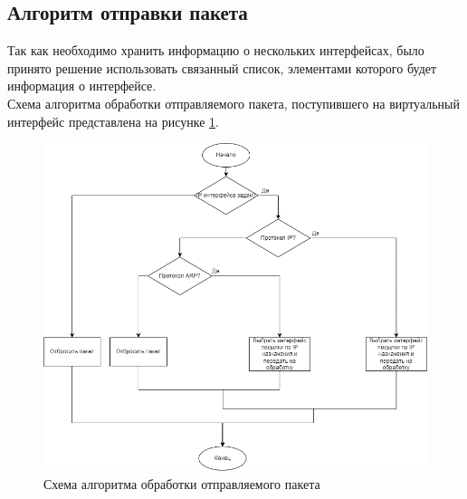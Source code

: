 \documentclass[14pt, a4paper]{extarticle}
\begin{document}
\subsection{Алгоритм отправки пакета}
Так как необходимо хранить информацию о нескольких интерфейсах, было принято решение использовать связанный список, элементами которого будет информация о интерфейсе. \\
\indent Схема алгоритма обработки отправляемого пакета, поступившего на виртуальный интерфейс представлена на рисунке \ref{out}.
\begin{figure}[H]
	\centering
	\includegraphics[scale=0.6]{out.png}
	\caption{Схема алгоритма обработки отправляемого пакета}
	\label{out}
\end{figure}
\end{document}
